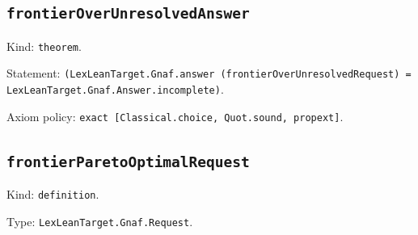 \documentclass[11pt]{article}
\begin{document}
\subsection*{\texttt{frontierOverUnresolvedAnswer}}
\noindent Kind: \texttt{theorem}.\par
\noindent Statement: \texttt{(LexLeanTarget.Gnaf.answer (frontierOverUnresolvedRequest) = LexLeanTarget.Gnaf.Answer.incomplete)}.\par
\noindent Axiom policy: \texttt{exact [Classical.choice, Quot.sound, propext]}.\par
\subsection*{\texttt{frontierParetoOptimalRequest}}
\noindent Kind: \texttt{definition}.\par
\noindent Type: \texttt{LexLeanTarget.Gnaf.Request}.\par
\end{document}
